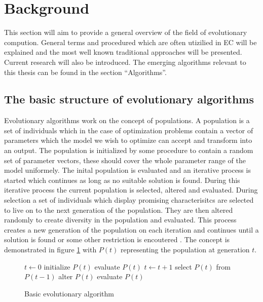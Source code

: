 \section{Background}

This section will aim to provide a general overview of the field of evolutionary compution. General terms and procedured which are often utizilied in EC will be explained and the most well known traditional approaches will be presented. Current research will also be introduced. The emerging algorithms relevant to this thesis can be found in the section ``Algorithms''.

\subsection{The basic structure of evolutionary algorithms}

Evolutionary algorithms work on the concept of populations. A population is a set of individuals which in the case of optimization problems contain a vector of parameters which the model we wish to optimize can accept and transform into an output. The population is initialized by some procedure to contain a random set of parameter vectors, these should cover the whole parameter range of the model uniformely. The inital population is evaluated and an iterative process is started which continues as long as no suitable solution is found. During this iterative process the current population is selected, altered and evaluated. During selection a set of individuals which display promising characterisitcs are selected to live on to the next generation of the population. They are then altered randomly to create diversity in the population and evaluated. This process creates a new generation of the population on each iteration and continues until a solution is found or some other restriction is encoutered \cite{Eiben20021}. The concept is demonstrated in figure \ref{algo:basicevolution} with $P(t)$ representing the population at generation $t$.

\begin{figure}[h]
  \centering
  \begin{minipage}{7.5cm}
    \begin{algorithmic}
       \State $t\gets 0$
       \State initialize $P(t)$
       \State evaluate $P(t)$
        \State $t\gets t + 1$
        \State select $P(t)$ from $P(t-1)$
        \State alter $P(t)$
        \State evaluate $P(t)$
       \EndWhile
    \end{algorithmic}
  \end{minipage}
  \caption{Basic evolutionary algorithm}
  \label{algo:basicevolution}
\end{figure}

